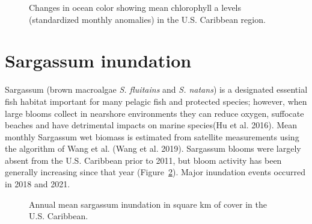 \documentclass[
  letterpaper,
  oneside,
  open=any]{scrbook}
\begin{document}
\begin{figure}


\caption{\label{fig-chl}Changes in ocean color showing mean chlorophyll
a levels (standardized monthly anomalies) in the U.S. Caribbean region.}

\end{figure}%

\section{Sargassum inundation}\label{sargassum-inundation}

Sargassum (brown macroalgae \emph{S. fluitains} and \emph{S. natans}) is
a designated essential fish habitat important for many pelagic fish and
protected species; however, when large blooms collect in nearshore
environments they can reduce oxygen, suffocate beaches and have
detrimental impacts on marine species(Hu et al. 2016). Mean monthly
Sargassum wet biomass is estimated from satellite measurements using the
algorithm of Wang et al. (Wang et al. 2019). Sargassum blooms were
largely absent from the U.S. Caribbean prior to 2011, but bloom activity
has been generally increasing since that year (Figure~\ref{fig-sarg}).
Major inundation events occurred in 2018 and 2021.

\begin{figure}


\caption{\label{fig-sarg}Annual mean sargassum inundation in square km
of cover in the U.S. Caribbean.}

\end{figure}%
\end{document}
